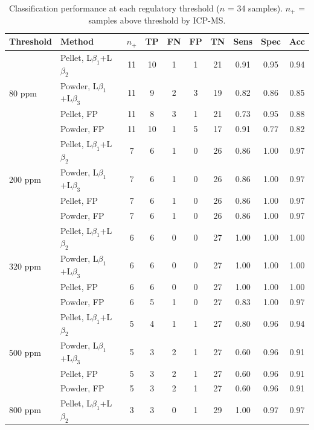 \documentclass[journal=esthag,manuscript=suppinfo]{achemso}
\begin{document}
\begin{table}[htbp]
\caption{Classification performance at each regulatory threshold ($n$ = 34 samples). $n_+$ = samples above threshold by ICP-MS.}
\label{tab:s4_threshold_classification}
\centering
\footnotesize
\begin{tabular}{l l c c c c c c c c}
\toprule
Threshold & Method & $n_+$ & TP & FN & FP & TN & Sens & Spec & Acc \\
\midrule
\multirow{4}{*}{80 ppm}
  & Pellet, L$\beta_1$+L$\beta_2$ & 11 & 10 & 1 & 1 & 21 & 0.91 & 0.95 & 0.94 \\
  & Powder, L$\beta_1$+L$\beta_3$ & 11 & 9  & 2 & 3 & 19 & 0.82 & 0.86 & 0.85 \\
  & Pellet, FP                    & 11 & 8  & 3 & 1 & 21 & 0.73 & 0.95 & 0.88 \\
  & Powder, FP                    & 11 & 10 & 1 & 5 & 17 & 0.91 & 0.77 & 0.82 \\
\midrule
\multirow{4}{*}{200 ppm}
  & Pellet, L$\beta_1$+L$\beta_2$ & 7 & 6 & 1 & 0 & 26 & 0.86 & 1.00 & 0.97 \\
  & Powder, L$\beta_1$+L$\beta_3$ & 7 & 6 & 1 & 0 & 26 & 0.86 & 1.00 & 0.97 \\
  & Pellet, FP                    & 7 & 6 & 1 & 0 & 26 & 0.86 & 1.00 & 0.97 \\
  & Powder, FP                    & 7 & 6 & 1 & 0 & 26 & 0.86 & 1.00 & 0.97 \\
\midrule
\multirow{4}{*}{320 ppm}
  & Pellet, L$\beta_1$+L$\beta_2$ & 6 & 6 & 0 & 0 & 27 & 1.00 & 1.00 & 1.00 \\
  & Powder, L$\beta_1$+L$\beta_3$ & 6 & 6 & 0 & 0 & 27 & 1.00 & 1.00 & 1.00 \\
  & Pellet, FP                    & 6 & 6 & 0 & 0 & 27 & 1.00 & 1.00 & 1.00 \\
  & Powder, FP                    & 6 & 5 & 1 & 0 & 27 & 0.83 & 1.00 & 0.97 \\
\midrule
\multirow{4}{*}{500 ppm}
  & Pellet, L$\beta_1$+L$\beta_2$ & 5 & 4 & 1 & 1 & 27 & 0.80 & 0.96 & 0.94 \\
  & Powder, L$\beta_1$+L$\beta_3$ & 5 & 3 & 2 & 1 & 27 & 0.60 & 0.96 & 0.91 \\
  & Pellet, FP                    & 5 & 3 & 2 & 1 & 27 & 0.60 & 0.96 & 0.91 \\
  & Powder, FP                    & 5 & 3 & 2 & 1 & 27 & 0.60 & 0.96 & 0.91 \\
\midrule
\multirow{4}{*}{800 ppm}
  & Pellet, L$\beta_1$+L$\beta_2$ & 3 & 3 & 0 & 1 & 29 & 1.00 & 0.97 & 0.97 \\

\end{tabular}
\end{table}
\end{document}
